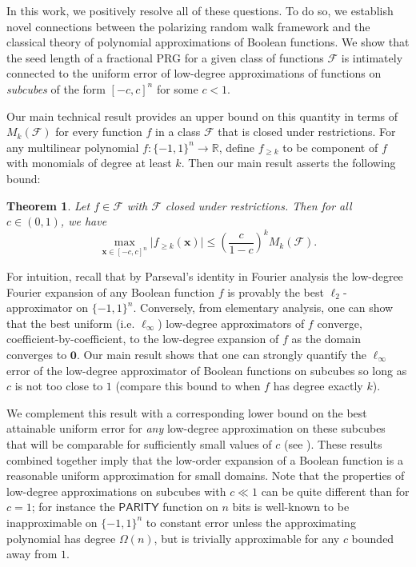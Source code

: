 \documentclass[10pt,a4paper]{article}
\newtheorem{THM}[theorem]{Theorem}
\theoremstyle{definition}
\begin{document}
{In this work, we positively resolve all of these questions. To do so, we establish novel connections between the polarizing random walk framework and the classical theory of polynomial approximations of Boolean functions. We show that the seed length of a fractional PRG for a given class of functions $\mathcal{F}$ is intimately connected to the uniform error of low-degree approximations of functions on \emph{subcubes} of the form $[-c,c]^n$ for some $c<1$.} 

{Our main technical result provides an upper bound on this quantity in terms of $M_k(\mathcal{F})$ for every function $f$ in a class $\mathcal{F}$ that is closed under restrictions. For any multilinear polynomial $f:\{-1,1\}^n\to \mathbb{R}$, define $f_{\geq k}$ to be component of $f$ with monomials of degree at least $k$. Then our main result asserts the following bound:}

\begin{THM}
\label{thm:upperbound}
        Let $f\in \mathcal{F}$ with $\mathcal{F}$ closed under restrictions.  Then for all $c \in (0,1)$, we have
    \begin{equation*}
        \max_{\mathbf{x} \in [-c , c]^n } \vert f_{\geq k} (\mathbf{x})\vert \leq \left( \frac{c}{1 - c} \right)^k M_k(\mathcal{F}).
    \end{equation*}
\end{THM}

{For intuition, recall that by Parseval's identity in Fourier analysis the low-degree Fourier expansion of any Boolean function $f$ is provably the best $\ell_2$-approximator on $\{-1,1\}^n$. Conversely, from elementary analysis, one can show that the best uniform (i.e. $\ell_{\infty}$) low-degree approximators of $f$ converge, coefficient-by-coefficient, to the low-degree expansion of $f$ as the domain converges to $\mathbf{0}$. Our main result shows that one can strongly quantify the $\ell_{\infty}$ error of the low-degree approximator of Boolean functions on subcubes so long as $c$ is not too close to $1$ (compare this bound to when $f$ has degree exactly $k$).}

{We complement this result with a corresponding lower bound on the best attainable uniform error for \emph{any} low-degree approximation on these subcubes that will be comparable for sufficiently small values of $c$ (see ).  These results combined together imply that the low-order expansion of a Boolean function is a reasonable uniform approximation for small domains.  Note that the properties of low-degree approximations on subcubes with $c\ll 1$ can be quite different than for $c=1$; for instance the $\mathsf{PARITY}$ function on $n$ bits is well-known to be inapproximable on $\{-1,1\}^n$ to constant error unless the approximating polynomial has degree $\Omega(n)$, but is trivially approximable for any $c$ bounded away from $1$.}
\end{document}
